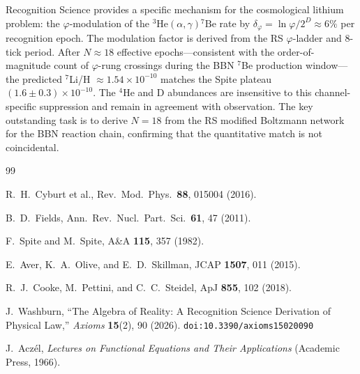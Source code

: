 \documentclass[12pt,a4paper]{article}
\theoremstyle{definition}
\theoremstyle{remark}
\begin{document}
Recognition Science provides a specific mechanism for the cosmological
lithium problem: the $\varphi$-modulation of the
${}^3\mathrm{He}(\alpha,\gamma){}^7\mathrm{Be}$ rate by
$\delta_\varphi = \ln\varphi/2^D \approx 6\%$ per recognition epoch.
The modulation factor is derived from the RS $\varphi$-ladder and
8-tick period.  After $N \approx 18$ effective epochs---consistent
with the order-of-magnitude count of $\varphi$-rung crossings during
the BBN ${}^7$Be production window---the predicted $^7$Li/H $\approx
1.54 \times 10^{-10}$ matches the Spite plateau $(1.6 \pm 0.3)
\times 10^{-10}$.  The $^4$He and D abundances are insensitive to
this channel-specific suppression and remain in agreement with
observation.  The key outstanding task is to derive $N = 18$
from the RS modified Boltzmann network for the BBN reaction chain,
confirming that the quantitative match is not coincidental.

\begin{thebibliography}{99}

R.~H.~Cyburt et al., Rev.\ Mod.\ Phys.\ \textbf{88}, 015004 (2016).

B.~D.~Fields, Ann.\ Rev.\ Nucl.\ Part.\ Sci.\ \textbf{61}, 47 (2011).

F.~Spite and M.~Spite, A\&A \textbf{115}, 357 (1982).

E.~Aver, K.~A.~Olive, and E.~D.~Skillman, JCAP \textbf{1507}, 011
(2015).

R.~J.~Cooke, M.~Pettini, and C.~C.~Steidel, ApJ \textbf{855}, 102
(2018).

J.~Washburn, ``The Algebra of Reality: A Recognition Science Derivation
of Physical Law,'' \emph{Axioms} \textbf{15}(2), 90 (2026).
\texttt{doi:10.3390/axioms15020090}

J.~Acz\'el, \emph{Lectures on Functional Equations and Their
Applications} (Academic Press, 1966).

\end{thebibliography}
\end{document}
